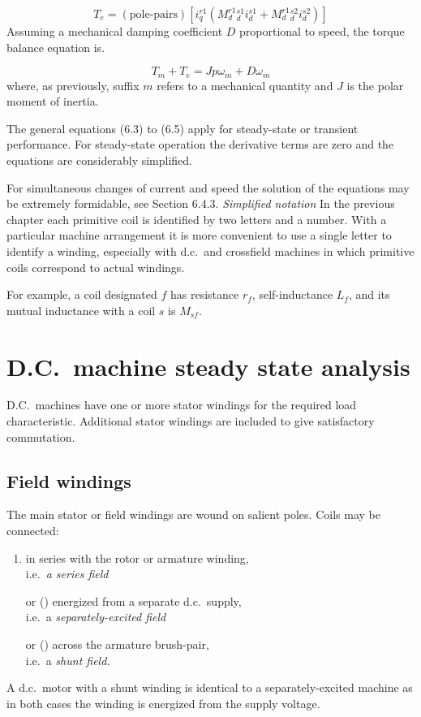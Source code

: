 \documentclass[a4paper,numbers=noenddot,12pt]{scrbook}
\begin{document}
\begin{equation}
    T_e = (\text{pole-pairs})[i_q^{r1}(M_d^{r1}{}_d^{s1} i_d^{s1} + M_d^{r1}{}_d^{s2} i_d^{s2})]
    \label{}
\end{equation}
Assuming a mechanical damping coefficient $D$ proportional to speed, the torque balance equation is.

\begin{equation}
    T_m + T_e = J p \omega_m + D \omega_m
    \label{}
\end{equation}
where, as previously, suffix $m$ refers to a mechanical quantity and $J$ is the polar moment of inertia.

The general equations (6.3) to (6.5) apply for steady-state or transient performance. For steady-state operation the derivative terms are zero and the equations are considerably simplified.

For simultaneous changes of current and speed the solution of the equations may be extremely formidable, see Section 6.4.3.
\noindent \textit{Simplified notation} In the previous chapter each primitive coil is identified by two letters and a number. With a particular machine arrangement it is more convenient to use a single letter to identify a winding, especially with d.c.\ and crossfield machines in which primitive coils correspond to actual windings.

For example, a coil designated $f$ has resistance $r_f$, self-inductance $L_f$, and its mutual inductance with a coil $s$ is $M_{sf}$.

\section{D.C.\ machine steady state analysis}
D.C.\ machines have one or more stator windings for the required load characteristic. Additional stator windings are included to give satisfactory commutation.

\subsection{Field windings}
The main stator or field windings are wound on salient poles. Coils may be connected:
\begin{enumerate}
    \item in series with the rotor or armature winding, \\
        i.e.\ \textit{a series field}
    \item[or \stepcounter{enumi} (\alph{enumi})] energized from a separate d.c.\ supply, \\
        i.e.\ a \textit{separately-excited field}
    \item[or \stepcounter{enumi} (\alph{enumi})] across the armature brush-pair,\\
        i.e.\ a \textit{shunt field.}
\end{enumerate}
A d.c.\ motor with a shunt winding is identical to a separately-excited machine as in both cases the winding is energized from the supply voltage.
\end{document}

